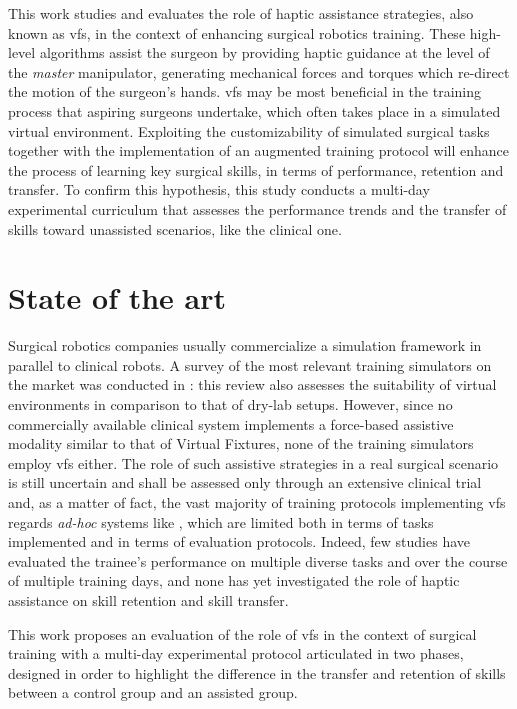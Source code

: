 \documentclass{article}
\begin{document}
\begin{multicols}{2}
This work studies and evaluates the role of haptic assistance strategies, also known as \acp{vf}, in the context of enhancing surgical robotics training. These high-level algorithms assist the surgeon by providing haptic guidance at the level of the \textit{master} manipulator, generating mechanical forces and torques which re-direct the motion of the surgeon's hands. \acp{vf} may be most beneficial in the training process that aspiring surgeons undertake, which often takes place in a simulated virtual environment. Exploiting the customizability of simulated surgical tasks together with the implementation of an augmented training protocol will enhance the process of learning key surgical skills, in terms of performance, retention and transfer. To confirm this hypothesis, this study conducts a multi-day experimental curriculum that assesses the performance trends and the transfer of skills toward unassisted scenarios, like the clinical one. 


\section{State of the art}
Surgical robotics companies usually commercialize a simulation framework in parallel to clinical robots. A survey of the most relevant training simulators on the market was conducted in \cite{Bric2016}: this review also assesses the suitability of virtual environments in comparison to that of dry-lab setups. However, since no commercially available clinical system implements a force-based assistive modality similar to that of Virtual Fixtures, none of the training simulators employ \acp{vf} either. The role of such assistive strategies in a real surgical scenario is still uncertain and shall be assessed only through an extensive clinical trial and, as a matter of fact, the vast majority of training protocols implementing \acp{vf} regards \textit{ad-hoc} systems like \cite{Lin2014}, which are limited both in terms of tasks implemented and in terms of evaluation protocols. Indeed, few studies \cite{Enayati2018} have evaluated the trainee's performance on multiple diverse tasks and over the course of multiple training days, and none has yet investigated the role of haptic assistance on skill retention and skill transfer. 

This work proposes an evaluation of the role of \acp{vf} in the context of surgical training with a multi-day experimental protocol articulated in two phases, designed in order to highlight the difference in the transfer and retention of skills between a control group and an assisted group. 

\end{multicols}
\end{document}
